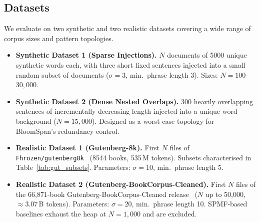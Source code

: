\documentclass[runningheads]{llncs}
\begin{document}
    \subsection{Datasets}

    We evaluate on two synthetic and two realistic datasets covering a wide range of corpus sizes and pattern topologies.

    \begin{itemize}[noitemsep, topsep=0pt]
        \item \textbf{Synthetic Dataset 1 (Sparse Injections).} $N$ documents of 5000 unique synthetic words each, with three short fixed sentences injected into a small random subset of documents ($\sigma = 3$, min.\ phrase length 3). Sizes: $N = 100$--$30{,}000$.

        \item \textbf{Synthetic Dataset 2 (Dense Nested Overlaps).} 300 heavily overlapping sentences of incrementally decreasing length injected into a unique-word background ($N = 15{,}000$). Designed as a worst-case topology for BloomSpan's redundancy control.

        \item \textbf{Realistic Dataset 1 (Gutenberg-8k).} First $N$ files of \texttt{Fhrozen/gutenberg8k}~\cite{gutenberg8k} (8544 books, 535\,M tokens). Subsets characterised in Table~\ref{tab:gut_subsets}. Parameters: $\sigma = 10$, min.\ phrase length 5.

        \item \textbf{Realistic Dataset 2 (Gutenberg-BookCorpus-Cleaned).} First $N$ files of the 66{,}871-book Gutenberg-BookCorpus-Cleaned release~\cite{gutenbergcleaned} ($N$ up to 50{,}000, $\approx 3.07$\,B tokens). Parameters: $\sigma = 20$, min.\ phrase length 10. SPMF-based baselines exhaust the heap at $N = 1{,}000$ and are excluded.
    \end{itemize}
\end{document}
